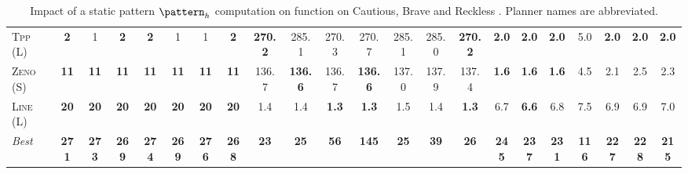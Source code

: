 \documentclass[11pt,landscape]{article}
\begin{document}
\begin{table}[tb]
{\begin{tabular}{|l||ccccccc||ccccccc||ccccccc||}
\textsc{Tpp} (L)&\textbf{2}&1&\textbf{2}&\textbf{2}&1&1&\textbf{2}&\textbf{270.2}&285.1&270.3&270.7&285.1&285.0&\textbf{270.2}&\textbf{2.0}&\textbf{2.0}&\textbf{2.0}&5.0&\textbf{2.0}&\textbf{2.0}&\textbf{2.0}\\
\textsc{Zeno} (S)&\textbf{11}&\textbf{11}&\textbf{11}&\textbf{11}&\textbf{11}&\textbf{11}&\textbf{11}&136.7&\textbf{136.6}&136.7&\textbf{136.6}&137.0&137.9&137.4&\textbf{1.6}&\textbf{1.6}&\textbf{1.6}&4.5&2.1&2.5&2.3\\
\textsc{Line} (L)&\textbf{20}&\textbf{20}&\textbf{20}&\textbf{20}&\textbf{20}&\textbf{20}&\textbf{20}&1.4&1.4&\textbf{1.3}&\textbf{1.3}&1.5&1.4&\textbf{1.3}&6.7&\textbf{6.6}&6.8&7.5&6.9&6.9&7.0
\\\hline
\textit{Best}&\textbf{271}&\textbf{273}&\textbf{269}&\textbf{274}&\textbf{269}&\textbf{276}&\textbf{268}&\textbf{23}&\textbf{25}&\textbf{56}&\textbf{145}&\textbf{25}&\textbf{39}&\textbf{26}&\textbf{245}&\textbf{237}&\textbf{231}&\textbf{116}&\textbf{227}&\textbf{228}&\textbf{215}\\\hline

        \end{tabular}}
        \caption{Impact of a static pattern $\pattern_h$ computation on function on Cautious, Brave and Reckless \pattyd. Planner names are abbreviated.}
        \label{tab:abl-patternh-static}
        \end{table}
        
\end{document}
